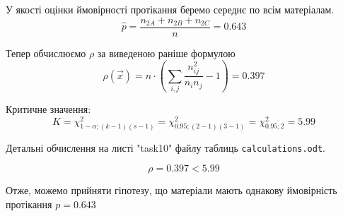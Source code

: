 \documentclass[11pt, a4paper]{article} %
\begin{document}
У якості оцінки ймовірності протікання беремо середнє по всім матеріалам.
$$\hat p = \frac{n_{2A} + n_{2B} + n_{2C}}{n} = 0.643$$

Тепер обчислюємо $\rho$ за виведеною раніше формулою
$$\rho(\vec x) = n \cdot \left(\sum_{i,j} \frac{n_{ij}^2}{n_i n_j} - 1\right) = 0.397$$

Критичне значення:
$$K = \chi^2_{1-\alpha; (k-1)(s-1)} = \chi^2_{0.95; (2-1)(3-1)} = \chi^2_{0.95; 2} = 5.99$$

Детальні обчислення на листі "task10" файлу таблиць \texttt{calculations.odt}.

\begin{mdframed}[style=ans]
    $$\rho = 0.397 < 5.99$$
    
    Отже, можемо прийняти гіпотезу, що матеріали мають однакову ймовірність протікання $p = 0.643$
\end{mdframed}
\end{document}
